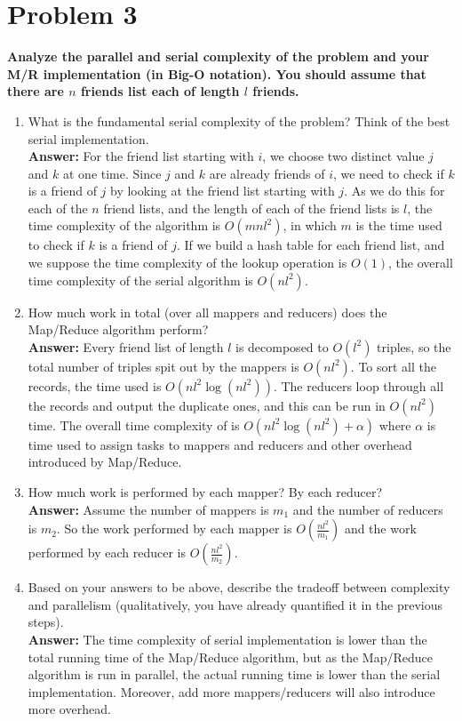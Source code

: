 \documentclass[letterpaper, 11pt]{article}
\begin{document}
\section*{Problem 3}
\textbf{Analyze the parallel and serial complexity of the problem and your M/R implementation (in Big-O notation). You should assume that there are $n$ friends list each of length $l$ friends.}
\begin{enumerate}
    \item What is the fundamental serial complexity of the problem? Think of the best serial implementation.\\
    \textbf{Answer:} For the friend list starting with $i$, we choose two distinct value $j$ and $k$ at one time. Since $j$ and $k$ are already friends of $i$, we need to check if $k$ is a friend of $j$ by looking at the friend list starting with $j$. As we do this for each of the $n$ friend lists, and the length of each of the friend lists is $l$, the time complexity of the algorithm is $O(mnl^2)$, in which $m$ is the time used to check if $k$ is a friend of $j$. If we build a hash table
    for each friend list, and we suppose the time complexity of the lookup operation is $O(1)$, the overall time complexity of the serial algorithm is $O(nl^2)$.
    \item How much work in total (over all mappers and reducers) does the Map/Reduce algorithm perform?\\
    \textbf{Answer:} Every friend list of length $l$ is decomposed to $O(l^2)$ triples, so the total number of triples spit out by the mappers is $O(nl^2)$. To sort all the records, the time used is $O(nl^2\log(nl^2))$. The reducers loop through all the records and output the duplicate ones, and this can be run in $O(nl^2)$ time. The overall time complexity of is $O(nl^2\log(nl^2)+\alpha)$ where $\alpha$ is time used to assign tasks to mappers and reducers and other overhead introduced
    by Map/Reduce.

    \item How much work is performed by each mapper? By each reducer?\\
    \textbf{Answer:} Assume the number of mappers is $m_1$ and the number of reducers is $m_2$. So the work performed by each mapper is $O(\frac{nl^2}{m_1})$ and the work performed by each reducer is $O(\frac{nl^2}{m_2})$.

    \item Based on your answers to be above, describe the tradeoff between complexity and parallelism (qualitatively, you have already quantified it in the previous steps).\\
    \textbf{Answer:} The time complexity of serial implementation is lower than the total running time of the Map/Reduce algorithm, but as the Map/Reduce algorithm is run in parallel, the actual running time is lower than the serial implementation. Moreover, add more mappers/reducers will also introduce more overhead.
\end{enumerate}
\end{document}
